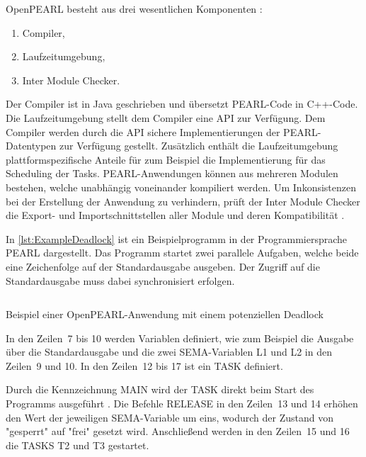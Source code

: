 OpenPEARL besteht aus drei wesentlichen Komponenten
\autocite{OpenPEARL_Structure}:
\begin{enumerate}
  \item Compiler,
  \item Laufzeitumgebung,
  \item Inter Module Checker.
\end{enumerate}
Der Compiler ist in Java geschrieben und übersetzt PEARL-Code in C++-Code. Die
Laufzeitumgebung stellt dem Compiler eine API zur Verfügung. Dem Compiler werden
durch die API sichere Implementierungen der PEARL-Datentypen zur Verfügung
gestellt. Zusätzlich enthält die Laufzeitumgebung plattformspezifische Anteile
für zum Beispiel die Implementierung für das Scheduling der Tasks.
PEARL-Anwendungen können aus mehreren Modulen bestehen, welche unabhängig
voneinander kompiliert werden. Um Inkonsistenzen bei der Erstellung der
Anwendung zu verhindern, prüft der Inter Module Checker die Export- und
Importschnittstellen aller Module und deren Kompatibilität
\autocite{OpenPEARL_Structure}.

In \cref{lst:ExampleDeadlock} ist ein Beispielprogramm in der Programmiersprache
PEARL dargestellt. Das Programm startet zwei parallele Aufgaben, welche beide
eine Zeichenfolge auf der Standardausgabe ausgeben. Der Zugriff auf die
Standardausgabe muss dabei synchronisiert erfolgen.
\begin{listing}[ht]
  \inputminted[frame=lines,linenos]{vim}{./Examples/Example_Deadlock.prl}
  \caption{Beispiel einer OpenPEARL-Anwendung mit einem potenziellen Deadlock}
  \label{lst:ExampleDeadlock}   
\end{listing} 
In den Zeilen~7 bis 10 werden Variablen definiert, wie zum Beispiel die Ausgabe
über die Standardausgabe und die zwei \textrm{SEMA}-Variablen \textrm{L1} und
\textrm{L2} in den Zeilen~9 und 10. In den Zeilen~12 bis 17 ist ein \textrm{TASK}
definiert.

Durch die Kennzeichnung \textrm{MAIN} wird der \textrm{TASK} direkt beim Start
des Programms ausgeführt \autocite[vgl.][28]{PEARL}. Die Befehle
\textrm{RELEASE} in den Zeilen~13 und 14 erhöhen den Wert der jeweiligen
\textrm{SEMA}-Variable um eins, wodurch der Zustand von "gesperrt" auf "frei"
gesetzt wird. Anschließend werden in den Zeilen~15 und 16 die \textrm{TASKS}
\textrm{T2} und \textrm{T3} gestartet.

